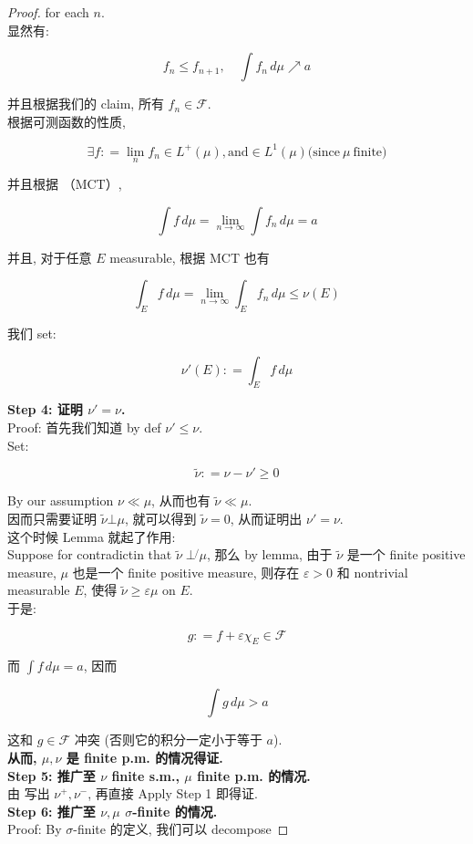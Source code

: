 \begin{proof}
for each \(n\).\\
显然有:

\[f_{n} \leq f_{n + 1},\quad\int f_{n}\, d\mu\operatorname{\nearrow }a\]

并且根据我们的 claim, 所有 \(f_{n} \in \mathcal{F}\).\\
根据可测函数的性质,

\[\exists f: = \lim\limits_{n}f_{n} \in L^{+}(\mu),\text{and} \in L^{1}(\mu)\text{(since}\ \mu\ \text{finite)}\]

并且根据 （MCT）,

\[\int f\, d\mu = \lim\limits_{n\rightarrow\infty}\int f_{n}\, d\mu = a\]

并且, 对于任意 \(E\) measurable, 根据 MCT 也有

\[\int_{E}f\, d\mu = \lim\limits_{n\rightarrow\infty}\int_{E}f_{n}\, d\mu \leq \nu(E)\]

我们 set:

\[\nu'(E): = \int_{E}f\, d\mu\]

\textbf{Step 4: 证明 \(\nu' = \nu\).}\\
Proof: 首先我们知道 by def \(\nu' \leq \nu\).\\
Set:

\[\widetilde{\nu}: = \nu - \nu' \geq 0\]

By our assumption \(\nu \ll \mu\), 从而也有 \(\widetilde{\nu} \ll \mu\).\\
因而只需要证明 \(\widetilde{\nu}\bot\mu\), 就可以得到 \(\widetilde{\nu} = 0\), 从而证明出 \(\nu' = \nu\).\\
这个时候 Lemma 就起了作用:\\
Suppose for contradictin that \(\widetilde{\nu}\operatorname{\perp\not{}}\mu\), 那么 by lemma, 由于 \(\widetilde{\nu}\) 是一个 finite positive measure, \(\mu\) 也是一个 finite positive measure, 则存在 \(\varepsilon > 0\) 和 nontrivial measurable \(E\), 使得 \(\widetilde{\nu} \geq \varepsilon\mu\) on \(E\).\\
于是:

\[g: = f + \varepsilon\chi_{E} \in \mathcal{F}\]

而 \(\int f\, d\mu = a\), 因而

\[\int g\, d\mu > a\]

这和 \(g \in \mathcal{F}\) 冲突 (否则它的积分一定小于等于 \(a\)).\\
\textbf{从而, \(\mu,\nu\) 是 finite p.m. 的情况得证.}\\
\textbf{Step 5: 推广至 \(\nu\) finite s.m., \(\mu\) finite p.m. 的情况.}\\
由  写出 \(\nu^{+},\nu^{-}\), 再直接 Apply Step 1 即得证.\\
\textbf{Step 6: 推广至 \(\nu,\mu\) \(\sigma\)-finite 的情况.}\\
Proof: By \(\sigma\)-finite 的定义, 我们可以 decompose


\end{proof}
